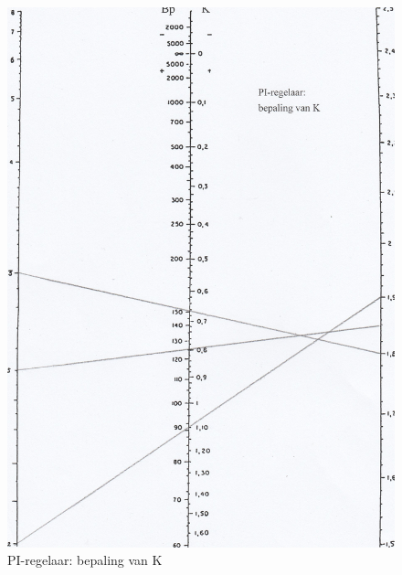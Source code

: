 \documentclass[a4paper, 12pt]{article}
\begin{document}
\begin{figure}[H]
	\includegraphics[width=1\linewidth]{Labo2_2_2.jpg}
	\caption{PI-regelaar: bepaling van K}
	\label{fig:fig2_2_2}
\end{figure}
\end{document}

